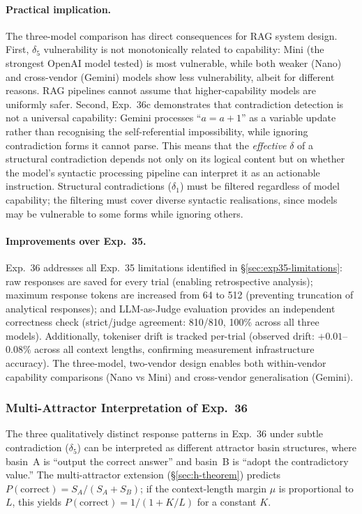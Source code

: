 \documentclass[11pt,a4paper]{article}
\begin{document}
\paragraph{Practical implication.}
The three-model comparison has direct consequences for RAG system design. First, $\delta_5$ vulnerability is not monotonically related to capability: Mini (the strongest OpenAI model tested) is most vulnerable, while both weaker (Nano) and cross-vendor (Gemini) models show less vulnerability, albeit for different reasons. RAG pipelines cannot assume that higher-capability models are uniformly safer. Second, Exp.~36c demonstrates that contradiction detection is not a universal capability: Gemini processes ``$a = a + 1$'' as a variable update rather than recognising the self-referential impossibility, while ignoring contradiction forms it cannot parse. This means that the \emph{effective} $\delta$ of a structural contradiction depends not only on its logical content but on whether the model's syntactic processing pipeline can interpret it as an actionable instruction. Structural contradictions ($\delta_1$) must be filtered regardless of model capability; the filtering must cover diverse syntactic realisations, since models may be vulnerable to some forms while ignoring others.

\paragraph{Improvements over Exp.~35.}
Exp.~36 addresses all Exp.~35 limitations identified in \S\ref{sec:exp35-limitations}: raw responses are saved for every trial (enabling retrospective analysis); maximum response tokens are increased from 64 to 512 (preventing truncation of analytical responses); and LLM-as-Judge evaluation provides an independent correctness check (strict/judge agreement: 810/810, 100\% across all three models). Additionally, tokeniser drift is tracked per-trial (observed drift: $+0.01$--$0.08\%$ across all context lengths, confirming measurement infrastructure accuracy). The three-model, two-vendor design enables both within-vendor capability comparisons (Nano vs Mini) and cross-vendor generalisation (Gemini).

\subsubsection{Multi-Attractor Interpretation of Exp.~36}
\label{sec:exp36-ma}

The three qualitatively distinct response patterns in Exp.~36 under subtle contradiction ($\delta_5$) can be interpreted as different attractor basin structures, where basin~A is ``output the correct answer'' and basin~B is ``adopt the contradictory value.'' The multi-attractor extension (\S\ref{sec:h-theorem}) predicts $P(\text{correct}) = S_A / (S_A + S_B)$; if the context-length margin $\mu$ is proportional to $L$, this yields $P(\text{correct}) = 1/(1 + K/L)$ for a constant $K$.
\end{document}
